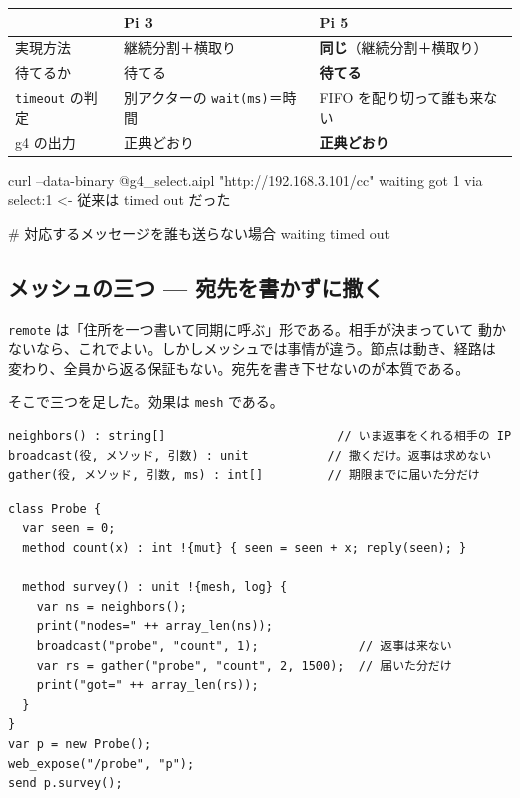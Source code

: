 \documentclass[11pt,a4paper]{ltjsarticle}
\begin{document}
\begin{center}
\small
\begin{tabular}{@{}lll@{}}
\toprule
 & Pi 3 & Pi 5 \\
\midrule
実現方法 & 継続分割＋横取り & \textbf{同じ}（継続分割＋横取り） \\
待てるか & 待てる & \textbf{待てる} \\
\texttt{timeout} の判定 & 別アクターの \texttt{wait(ms)}＝時間 & FIFO を配り切って誰も来ない \\
g4 の出力 & 正典どおり & \textbf{正典どおり} \\
\bottomrule
\end{tabular}
\end{center}

\begin{term}
curl --data-binary @g4_select.aipl "http://192.168.3.101/cc"
waiting
got 1
via select:1            <- 従来は timed out だった

# 対応するメッセージを誰も送らない場合
waiting
timed out
\end{term}

\subsection{メッシュの三つ --- 宛先を書かずに撒く}
\label{sec:xinu-mesh}

\texttt{remote} は「住所を一つ書いて同期に呼ぶ」形である。相手が決まっていて
動かないなら、これでよい。しかしメッシュでは事情が違う。節点は動き、経路は
変わり、全員から返る保証もない。宛先を書き下せないのが本質である。

そこで三つを足した。効果は \texttt{mesh} である。

\begin{lstlisting}
neighbors() : string[]                        // いま返事をくれる相手の IP
broadcast(役, メソッド, 引数) : unit           // 撒くだけ。返事は求めない
gather(役, メソッド, 引数, ms) : int[]         // 期限までに届いた分だけ
\end{lstlisting}

\begin{lstlisting}
class Probe {
  var seen = 0;
  method count(x) : int !{mut} { seen = seen + x; reply(seen); }

  method survey() : unit !{mesh, log} {
    var ns = neighbors();
    print("nodes=" ++ array_len(ns));
    broadcast("probe", "count", 1);              // 返事は来ない
    var rs = gather("probe", "count", 2, 1500);  // 届いた分だけ
    print("got=" ++ array_len(rs));
  }
}
var p = new Probe();
web_expose("/probe", "p");
send p.survey();
\end{lstlisting}
\end{document}
